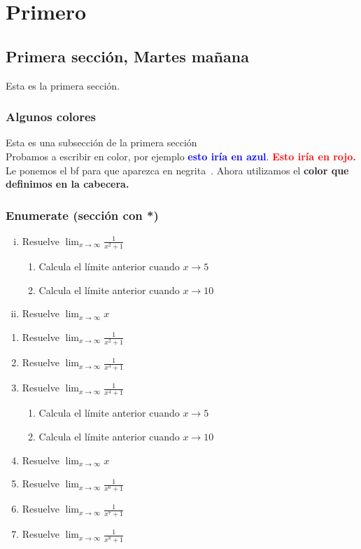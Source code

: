 \chapter{Primero}


\section[Martes mañana]{Primera sección, Martes mañana}
Esta es la primera sección.
\subsection[Colores]{Algunos colores}
Esta es una subsección de la primera sección\\
Probamos a escribir en color, por ejemplo \textcolor{blue}{\bf esto iría en azul}. \textcolor{red}{\bf Esto iría en rojo.} Le ponemos el bf para que aparezca en negrita~. Ahora utilizamos el \textcolor{moradito}{\bf color que definimos en la cabecera.}

\subsection*{Enumerate (sección con *)}

\begin{enumerate}[i).-]
	\item Resuelve $\lim_{x\to \infty}\frac{1}{x^2+1}$
	\begin{enumerate}[1;]
		\item Calcula el límite anterior cuando $x\to 5$
		\item Calcula el límite anterior cuando $x\to 10$
	\end{enumerate} 
	\item Resuelve $\lim_{x\to \infty} x$
\end{enumerate}

\begin{enumerate}
	\item Resuelve $\lim_{x\to \infty}\frac{1}{x^2+1}$
	\item Resuelve $\lim_{x\to \infty}\frac{1}{x^3+1}$
	\item Resuelve $\lim_{x\to \infty}\frac{1}{x^4+1}$
	\addtocounter{enumi}{2}
	\begin{enumerate} 
		\item Calcula el límite anterior cuando $x\to 5$
		\item Calcula el límite anterior cuando $x\to 10$
	\end{enumerate} 
	\item Resuelve $\lim_{x\to \infty} x$
	\item Resuelve $\lim_{x\to \infty}\frac{1}{x^6+1}$
	\item Resuelve $\lim_{x\to \infty}\frac{1}{x^7+1}$
	\addtocounter{enumi}{-5}
	\item Resuelve $\lim_{x\to \infty}\frac{1}{x^8+1}$
\end{enumerate}


